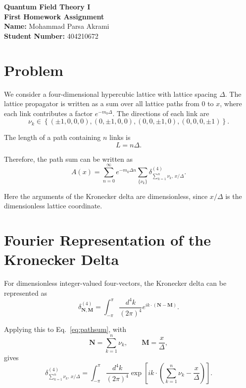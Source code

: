 \documentclass[12pt,a4paper]{article}
\begin{document}
\begin{center}
    {\Large \textbf{Quantum Field Theory I}}\\[0.3cm]
    {\large \textbf{First Homework Assignment}}\\[0.5cm]
    \textbf{Name:} Mohammad Parsa Akrami\\
    \textbf{Student Number:} 404210672
\end{center}

\vspace{0.5cm}

\section*{Problem}

We consider a four-dimensional hypercubic lattice with lattice spacing $\Delta$.
The lattice propagator is written as a sum over all lattice paths from $0$ to $x$,
where each link contributes a factor $e^{-m_0\Delta}$. The directions of each
link are
\[
\nu_k\in
\left\{
(\pm1,0,0,0),
(0,\pm1,0,0),
(0,0,\pm1,0),
(0,0,0,\pm1)
\right\}.
\]

The length of a path containing $n$ links is
\[
L=n\Delta.
\]

Therefore, the path sum can be written as
\begin{equation}
A(x)
=
\sum_{n=0}^{\infty}
e^{-m_0\Delta n}
\sum_{\{\nu_k\}}
\delta^{(4)}_{\sum_{k=1}^{n}\nu_k,\,x/\Delta}.
\label{eq:pathsum}
\end{equation}

Here the arguments of the Kronecker delta are dimensionless, since
$x/\Delta$ is the dimensionless lattice coordinate.

\section*{Fourier Representation of the Kronecker Delta}

For dimensionless integer-valued four-vectors, the Kronecker delta can be
represented as
\begin{equation}
\delta^{(4)}_{\bm N,\bm M}
=
\int_{-\pi}^{\pi}
\frac{d^4 k}{(2\pi)^4}
e^{i k\cdot(\bm N-\bm M)}.
\label{eq:kronecker}
\end{equation}

Applying this to Eq.~\eqref{eq:pathsum}, with
\[
\bm N=\sum_{k=1}^{n}\nu_k,
\qquad
\bm M=\frac{x}{\Delta},
\]
gives
\begin{equation}
\delta^{(4)}_{\sum_{k=1}^{n}\nu_k,\,x/\Delta}
=
\int_{-\pi}^{\pi}
\frac{d^4 k}{(2\pi)^4}
\exp\left[
ik\cdot
\left(
\sum_{k=1}^{n}\nu_k-\frac{x}{\Delta}
\right)
\right].
\end{equation}
\end{document}

